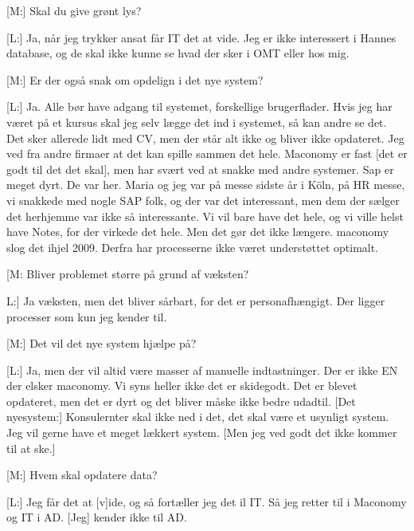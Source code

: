 [M:] Skal du give grønt lys?

[L:] Ja, når jeg trykker ansat får IT det at vide. Jeg er ikke interessert i Hannes database, og de skal ikke kunne se hvad der sker i OMT eller hos mig.

[M:] Er der også snak om opdelign i det nye system?

[L:] Ja.
Alle bør have adgang til systemet, forskellige brugerflader. Hvis jeg har været på et kursus skal jeg selv lægge det ind i systemet, så kan andre se det. Det sker allerede lidt med CV, men der står alt ikke og bliver ikke opdateret.
Jeg ved fra andre firmaer at det kan spille sammen det hele.
Maconomy er fast [det er godt til det det skal], men har svært ved at snakke med andre systemer. Sap er meget dyrt. De var her.
Maria og jeg var på messe sidste år i Köln, på HR messe, vi snakkede med nogle SAP folk, og der var det interessant, men dem der sælger det herhjemme var ikke så interessante. Vi vil bare have det hele, og vi ville helst have Notes, for der virkede det hele. Men det gør det ikke længere. maconomy slog det ihjel 2009. Derfra har processerne ikke været understøttet optimalt. 

[M: Bliver problemet større på grund af væksten? 

L:] Ja væksten, men det bliver sårbart, for det er personafhængigt. Der ligger processer som kun jeg kender til.

[M:] Det vil det nye system hjælpe på?

[L:] Ja, men der vil altid være masser af manuelle indtastninger. Der er ikke EN der elsker maconomy. Vi syns heller ikke det er skidegodt. Det er blevet opdateret, men det er dyrt og det bliver måske ikke bedre udadtil.
[Det nyesystem:]
Konsulernter skal ikke ned i det, det skal være et usynligt system. Jeg vil gerne have et meget lækkert system. [Men jeg ved godt det ikke kommer til at ske.]

[M:] Hvem skal opdatere data?

[L:] Jeg får det at [v]ide, og så fortæller jeg det il IT. Så jeg retter til i Maconomy og IT i AD. [Jeg] kender ikke til AD.